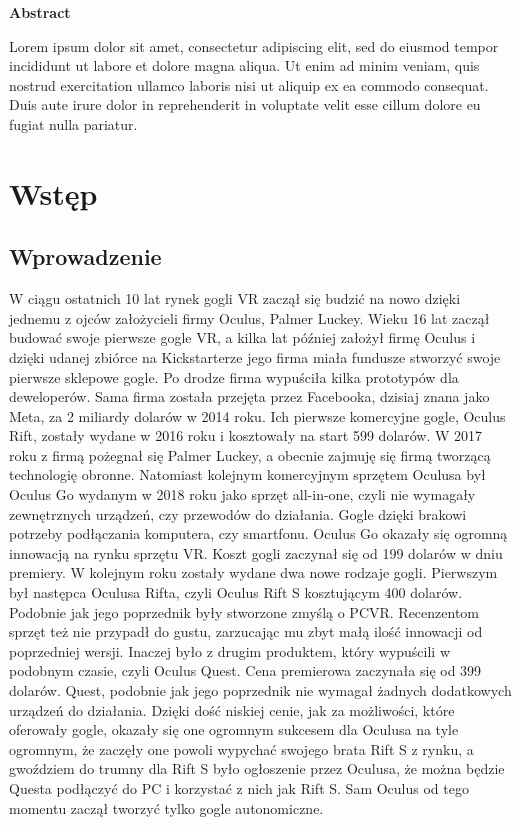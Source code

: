 \documentclass[a4paper,12pt,reqno]{article}
\begin{document}
\newpage
\begin{flushleft}
\Large \textbf{Abstract}
\end{flushleft}
\vspace{1cm}


Lorem ipsum dolor sit amet, consectetur adipiscing elit, sed do eiusmod tempor incididunt ut labore et dolore magna aliqua. Ut enim ad minim veniam, quis nostrud exercitation ullamco laboris nisi ut aliquip ex ea commodo consequat. Duis aute irure dolor in reprehenderit in voluptate velit esse cillum dolore eu fugiat nulla pariatur.

\newpage

\section{Wstęp}

\subsection{Wprowadzenie}

W ciągu ostatnich 10 lat rynek gogli VR zaczął się budzić na nowo dzięki jednemu z ojców założycieli firmy Oculus, Palmer Luckey. Wieku 16 lat zaczął budować swoje pierwsze gogle VR, a kilka lat później założył firmę Oculus i dzięki udanej zbiórce na Kickstarterze jego firma miała fundusze stworzyć swoje pierwsze sklepowe gogle. Po drodze firma wypuściła kilka prototypów dla deweloperów. Sama firma została przejęta przez Facebooka, dzisiaj znana jako Meta, za 2 miliardy dolarów w 2014 roku. Ich pierwsze komercyjne gogle, Oculus Rift, zostały wydane w 2016 roku i kosztowały na start 599 dolarów. W 2017 roku z firmą pożegnał się Palmer Luckey, a obecnie zajmuję się firmą tworzącą technologię obronne. Natomiast kolejnym komercyjnym sprzętem Oculusa był Oculus Go wydanym w 2018 roku jako sprzęt all-in-one, czyli nie wymagały zewnętrznych urządzeń, czy przewodów do działania. Gogle dzięki brakowi potrzeby podłączania komputera, czy smartfonu. Oculus Go okazały się ogromną innowacją na rynku sprzętu VR. Koszt gogli zaczynał się od 199 dolarów w dniu premiery. W kolejnym roku zostały wydane dwa nowe rodzaje gogli. Pierwszym był następca Oculusa Rifta, czyli Oculus Rift S kosztującym 400 dolarów. Podobnie jak jego poprzednik były stworzone zmyślą o PCVR. Recenzentom sprzęt też nie przypadł do gustu, zarzucając mu zbyt małą ilość innowacji od poprzedniej wersji. Inaczej było z drugim produktem, który wypuścili w podobnym czasie, czyli Oculus Quest. Cena premierowa zaczynała się od 399 dolarów. Quest, podobnie jak jego poprzednik nie wymagał żadnych dodatkowych urządzeń do działania. Dzięki dość niskiej cenie, jak za możliwości, które oferowały gogle, okazały się one ogromnym sukcesem dla Oculusa na tyle ogromnym, że zaczęły one powoli wypychać swojego brata Rift S z rynku, a gwoździem do trumny dla Rift S było ogłoszenie przez Oculusa, że można będzie Questa podłączyć do PC i korzystać z nich jak Rift S. Sam Oculus od tego momentu zaczął tworzyć tylko gogle autonomiczne.
\end{document}
